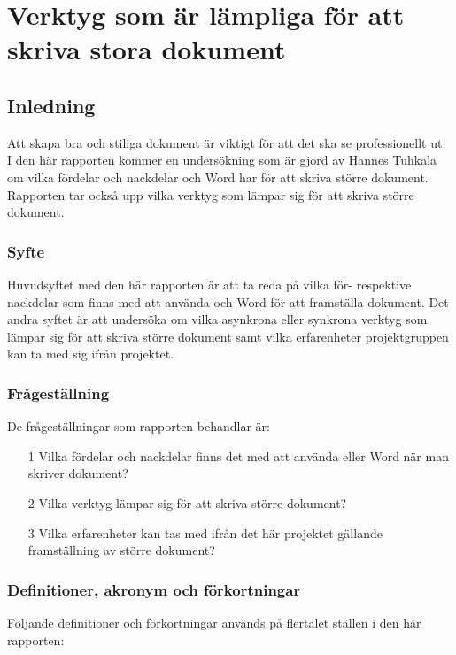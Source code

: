 \chapter{Verktyg som är lämpliga för att skriva stora dokument}
\label{cha:indiv-report-tuhkala}

\section{Inledning}
\label{sec:introduction-tuhkala}
Att skapa bra och stiliga dokument är viktigt för att det ska se professionellt ut. I den här rapporten kommer en undersökning som är gjord av Hannes Tuhkala om vilka fördelar och nackdelar \latex och Word har för att skriva större dokument. Rapporten tar också upp vilka verktyg som lämpar sig för att skriva större dokument.

\subsection{Syfte}
\label{sec:purpose-tuhkala}
Huvudsyftet med den här rapporten är att ta reda på vilka för- respektive nackdelar som finns med att använda \latex och Word för att framställa dokument. Det andra syftet är att undersöka om vilka asynkrona eller synkrona verktyg som lämpar sig för att skriva större dokument samt vilka erfarenheter projektgruppen kan ta med sig ifrån projektet.

\subsection{Frågeställning}
\label{sec:issue-tuhkala}
De frågeställningar som rapporten behandlar är:

\begin{itemize}
	\item [1] Vilka fördelar och nackdelar finns det med att använda \latex eller Word när man skriver dokument?
	\item [2] Vilka verktyg lämpar sig för att skriva större dokument?
	\item [3] Vilka erfarenheter kan tas med ifrån det här projektet gällande framställning av större dokument?
\end{itemize}

\subsection{Definitioner, akronym och förkortningar}
Följande definitioner och förkortningar används på flertalet ställen i den här rapporten:

